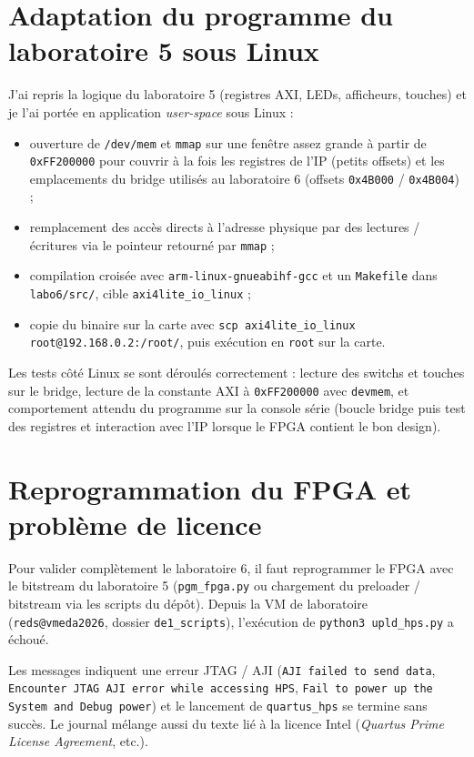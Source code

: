 \documentclass[a4paper,12pt]{article}
\begin{document}
\section{Adaptation du programme du laboratoire 5 sous Linux}

J'ai repris la logique du laboratoire 5 (registres AXI, LEDs, afficheurs, touches) et je l'ai portée en application \emph{user-space} sous Linux :

\begin{itemize}
    \item ouverture de \texttt{/dev/mem} et \texttt{mmap} sur une fenêtre assez grande à partir de \texttt{0xFF200000} pour couvrir à la fois les registres de l'IP (petits offsets) et les emplacements du bridge utilisés au laboratoire 6 (offsets \texttt{0x4B000} / \texttt{0x4B004}) ;
    \item remplacement des accès directs à l'adresse physique par des lectures / écritures via le pointeur retourné par \texttt{mmap} ;
    \item compilation croisée avec \texttt{arm-linux-gnueabihf-gcc} et un \texttt{Makefile} dans \texttt{labo6/src/}, cible \texttt{axi4lite\_io\_linux} ;
    \item copie du binaire sur la carte avec \texttt{scp axi4lite\_io\_linux root@192.168.0.2:/root/}, puis exécution en \texttt{root} sur la carte.
\end{itemize}

Les tests côté Linux se sont déroulés correctement : lecture des switchs et touches sur le bridge, lecture de la constante AXI à \texttt{0xFF200000} avec \texttt{devmem}, et comportement attendu du programme sur la console série (boucle bridge puis test des registres et interaction avec l'IP lorsque le FPGA contient le bon design).

\newpage

\section{Reprogrammation du FPGA et problème de licence}

Pour valider complètement le laboratoire 6, il faut reprogrammer le FPGA avec le bitstream du laboratoire 5 (\texttt{pgm\_fpga.py} ou chargement du preloader / bitstream via les scripts du dépôt). Depuis la VM de laboratoire (\texttt{reds@vmeda2026}, dossier \texttt{de1\_scripts}), l'exécution de \texttt{python3 upld\_hps.py} a échoué.

Les messages indiquent une erreur JTAG / AJI (\texttt{AJI failed to send data}, \texttt{Encounter JTAG AJI error while accessing HPS}, \texttt{Fail to power up the System and Debug power}) et le lancement de \texttt{quartus\_hps} se termine sans succès. Le journal mélange aussi du texte lié à la licence Intel (\emph{Quartus Prime License Agreement}, etc.).
\end{document}
